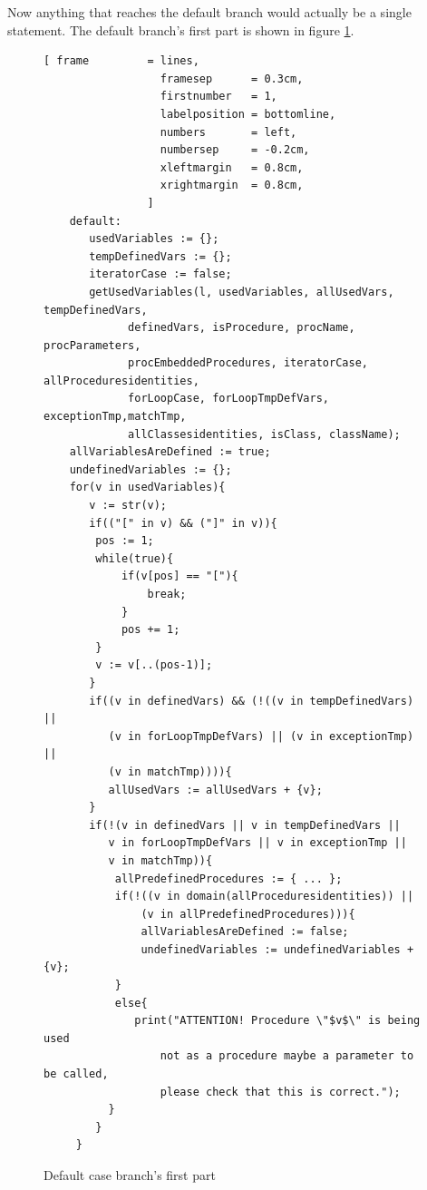 \documentclass[11pt]{report}
\begin{document}
Now anything that reaches the default branch would actually be a single statement. The default branch's first part is shown in figure \ref{fig:default case branch}.

\begin{figure}[!htb]
\centering
\begin{Verbatim}[ frame         = lines, 
                  framesep      = 0.3cm, 
                  firstnumber   = 1,
                  labelposition = bottomline,
                  numbers       = left,
                  numbersep     = -0.2cm,
                  xleftmargin   = 0.8cm,
                  xrightmargin  = 0.8cm,
                ]
    default:              
       usedVariables := {};
       tempDefinedVars := {};
       iteratorCase := false;
       getUsedVariables(l, usedVariables, allUsedVars, tempDefinedVars,
	         definedVars, isProcedure, procName, procParameters,
	         procEmbeddedProcedures, iteratorCase, allProceduresidentities, 
	         forLoopCase, forLoopTmpDefVars, exceptionTmp,matchTmp, 
	         allClassesidentities, isClass, className);
	allVariablesAreDefined := true;
	undefinedVariables := {};
	for(v in usedVariables){
	   v := str(v);
	   if(("[" in v) && ("]" in v)){
		pos := 1;
		while(true){
			if(v[pos] == "["){
				break;
			}
			pos += 1;
		}
		v := v[..(pos-1)];
	   }
	   if((v in definedVars) && (!((v in tempDefinedVars) || 
	      (v in forLoopTmpDefVars) || (v in exceptionTmp) || 
	      (v in matchTmp)))){
		  allUsedVars := allUsedVars + {v};
	   }
	   if(!(v in definedVars || v in tempDefinedVars || 
	      v in forLoopTmpDefVars || v in exceptionTmp ||
	      v in matchTmp)){
		   allPredefinedProcedures := { ... };
		   if(!((v in domain(allProceduresidentities)) ||
		       (v in allPredefinedProcedures))){
			   allVariablesAreDefined := false;
			   undefinedVariables := undefinedVariables + {v};
		   }
		   else{
			  print("ATTENTION! Procedure \"$v$\" is being used 
			      not as a procedure maybe a parameter to be called,
			      please check that this is correct.");
		  }
	    }
	 }
\end{Verbatim}
\vspace*{-0.5cm}
\caption{Default case branch's first part}
\label{fig:default case branch}
\end{figure}
\end{document}
